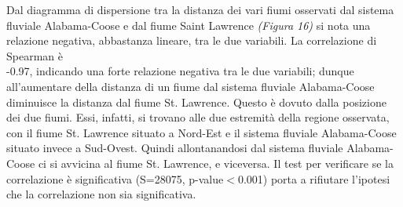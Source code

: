 \documentclass{article} %
\begin{document}
Dal diagramma di dispersione tra la distanza dei vari fiumi osservati dal sistema fluviale Alabama-Coose e dal fiume Saint Lawrence \textit{(Figura 16)} si nota una relazione negativa, abbastanza lineare, tra le due variabili.  
La correlazione di Spearman è \\-0.97, indicando una forte relazione negativa tra le due variabili; dunque all'aumentare della distanza di un fiume dal sistema fluviale Alabama-Coose diminuisce la distanza dal fiume St. Lawrence. 
Questo è dovuto dalla posizione dei due fiumi. Essi, infatti, si trovano alle due estremità della regione osservata, con il fiume St. Lawrence situato a Nord-Est e il sistema fluviale Alabama-Coose situato invece a Sud-Ovest. Quindi allontanandosi dal sistema fluviale Alabama-Coose ci si avvicina al fiume St. Lawrence, e viceversa.
Il test per verificare se la correlazione è significativa (S=28075, p-value$<$0.001) porta a rifiutare l'ipotesi che la correlazione non sia significativa.
\end{document}
